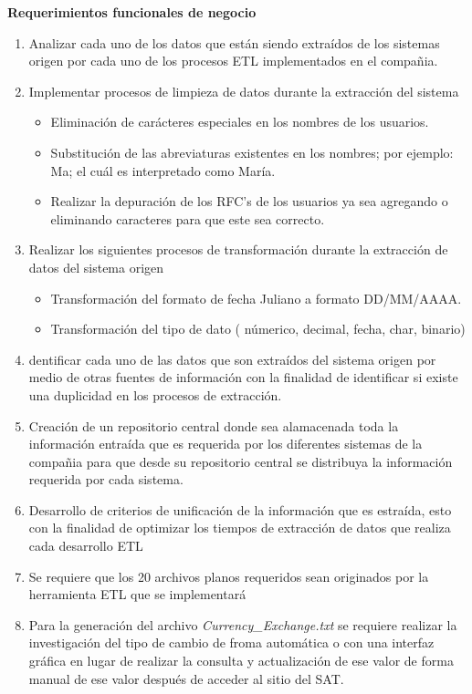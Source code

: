 \textbf{Requerimientos funcionales de negocio}

\begin{enumerate}
\item Analizar cada uno de los datos que están siendo extraídos de los sistemas origen por cada uno de los procesos ETL implementados en el compañia.
\item Implementar procesos de limpieza de datos durante la extracción del sistema
\begin {itemize}
\item Eliminación de carácteres especiales en los nombres de los usuarios.
\item Substitución de las abreviaturas existentes en los nombres; por ejemplo: Ma; el cuál es interpretado como María.
\item Realizar la depuración de los RFC's de los usuarios ya sea agregando o eliminando caracteres para que este sea correcto.
\end{itemize}
\item Realizar los siguientes procesos de transformación durante la extracción de datos del sistema origen
\begin {itemize}
\item Transformación del formato de fecha Juliano a formato DD/MM/AAAA.
\item Transformación del tipo de dato ( númerico, decimal, fecha, char, binario)
\end{itemize}
\item dentificar cada uno de las datos que son extraídos del sistema origen por medio de otras fuentes de información con la finalidad de identificar si existe una duplicidad en los procesos de extracción.
\item Creación de un repositorio central donde sea alamacenada toda la información entraída que es requerida por los diferentes sistemas de la compañia para que desde su repositorio central se distribuya la información requerida por cada sistema.
\item Desarrollo de criterios de unificación de la información que es estraída, esto con la finalidad de optimizar los tiempos de extracción de datos que realiza cada desarrollo ETL
\item Se requiere que los 20 archivos planos requeridos sean originados por la herramienta ETL que se implementará
\item Para la generación del archivo \textit{Currency\_Exchange.txt} se requiere realizar la investigación del tipo de cambio de froma automática o con una interfaz gráfica en lugar de realizar la consulta y actualización de ese valor de forma manual de ese valor después de acceder al sitio del SAT.

\end{enumerate}
